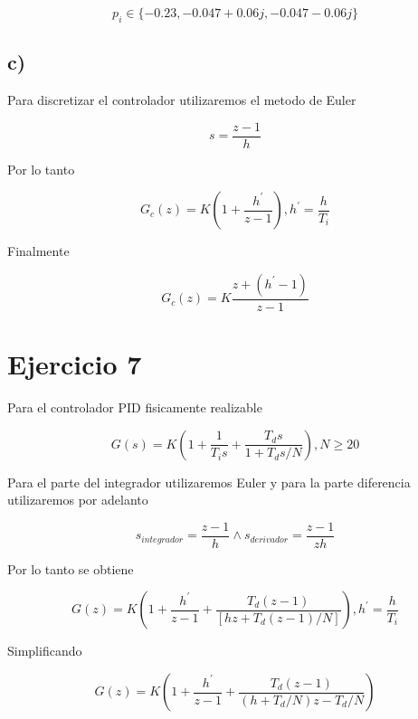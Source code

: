\documentclass{article}
\begin{document}
            \begin{equation}
                p_i \in \{ -0.23, -0.047+0.06j, -0.047-0.06j  \}
            \end{equation}

        \subsection{c)}

            Para discretizar el controlador utilizaremos el metodo de Euler

            \begin{equation}
                s = \frac{z-1}{h}
            \end{equation}

            Por lo tanto

            \begin{equation}
                G_c(z) = K\left( 1 + \frac{h^\prime}{z-1} \right), h^\prime = \frac{h}{T_i}
            \end{equation}

            Finalmente 

            \begin{equation}
                G_c(z) = K \frac{ z + ( h^\prime - 1 ) }{z - 1}
            \end{equation}

    \section{Ejercicio 7}

        Para el controlador PID fisicamente realizable 

        \begin{equation}
            G(s) = K\left( 1 + \frac{1}{T_is} + \frac{T_ds}{1 + T_ds/N} \right), N \geq 20
        \end{equation}

        Para el parte del integrador utilizaremos Euler y para la parte diferencia utilizaremos por adelanto 

        \begin{equation}
            s_{integrador} = \frac{z-1}{h} \land s_{derivador} = \frac{z-1}{zh}
        \end{equation}

        Por lo tanto se obtiene 

        \begin{equation}
            G(z) = K \left( 1 + \frac{h^\prime}{z-1} + \frac{T_d(z-1)}{[ hz + T_d(z-1)/N]} \right), h^\prime = \frac{h}{T_i}
        \end{equation}

        Simplificando 

        \begin{equation}
            G(z) = K \left( 1 +  \frac{h^\prime}{z-1} + \frac{T_d (z-1)}{ (h + T_d/N)z - T_d/N }   \right)
        \end{equation}
\end{document}
